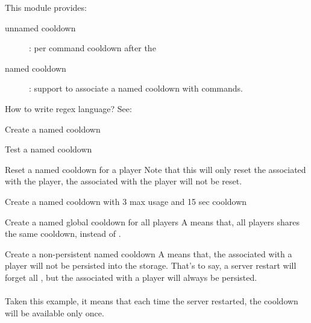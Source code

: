 \label{ch:command_cooldown}

This module provides:

\begin{description}
    \item [unnamed cooldown]: {per command cooldown after the }
    \item [named cooldown]: {support to associate a named cooldown with commands.}
\end{description}

\begin{tips}{How to write regex language?}
    See:~
\end{tips}


\begin{example}{Create a named cooldown}
\end{example}

\begin{example}{Test a named cooldown}
\end{example}

\begin{example}{Reset a named cooldown for a player}
    Note that this will only reset the  associated with the player, the  associated with the player will not be reset.\\
\end{example}

\begin{example}{Create a named cooldown with 3 max usage and 15 sec cooldown}
\end{example}

\begin{example}{Create a named global cooldown for all players}
    A  means that, all players shares the same cooldown, instead of .\\
\end{example}

\begin{example}{Create a non-persistent named cooldown}
    A  means that, the  associated with a player will not be persisted into the storage.
    That's to say, a server restart will forget all , but the  associated with a player will always be persisted.\\
    \\
    Taken this example, it means that each time the server restarted, the cooldown will be available only once.
\end{example}
